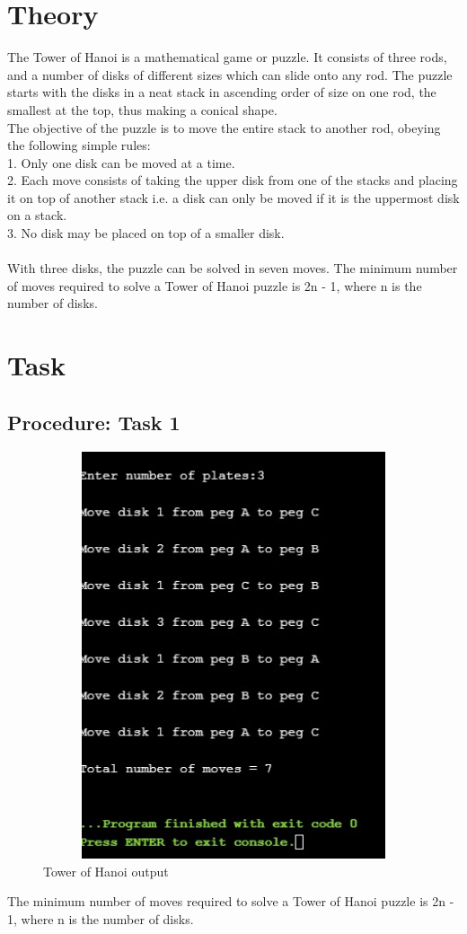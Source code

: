 \documentclass[11pt]{article}            %
\begin{document}
\section{Theory }              
The Tower of Hanoi is a mathematical game or puzzle. It consists of three rods, and a number of disks of different sizes which can slide onto any rod. The puzzle starts with the disks in a neat stack in ascending order of size on one rod, the smallest at the top, thus making a conical shape. \\
The objective of the puzzle is to move the entire stack to another rod, obeying the following simple rules:\\
1.	Only one disk can be moved at a time.\\
2.	Each move consists of taking the upper disk from one of the stacks and placing it on top of another stack i.e. a disk can only be moved if it is the uppermost disk on a stack.\\
3.	No disk may be placed on top of a smaller disk.\\ \\
With three disks, the puzzle can be solved in seven moves. 
The minimum number of moves required to solve a Tower of Hanoi puzzle is 2n - 1, where n is the number of disks.

\section{Task}  
\subsection{Procedure: Task 1 }     

\begin{figure}
\centering
  \includegraphics[width=24cm,height=12cm,keepaspectratio]{22.jpg}
\caption{Tower of Hanoi output}
\label{Figure:3}    
\end{figure}
The minimum number of moves required to solve a Tower of Hanoi puzzle is 2n - 1, where n is the number of disks.
\end{document}
